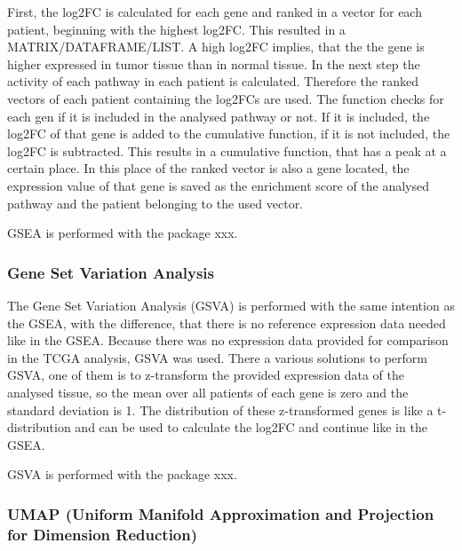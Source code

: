 \documentclass[
  parskip,
  oneside]{scrreprt}
\begin{document}
First, the log2FC is calculated for each gene and ranked in a vector for
each patient, beginning with the highest log2FC. This resulted in a
MATRIX/DATAFRAME/LIST. A high log2FC implies, that the the gene is
higher expressed in tumor tissue than in normal tissue. In the next step
the activity of each pathway in each patient is calculated. Therefore
the ranked vectors of each patient containing the log2FCs are used. The
function checks for each gen if it is included in the analysed pathway
or not. If it is included, the log2FC of that gene is added to the
cumulative function, if it is not included, the log2FC is subtracted.
This results in a cumulative function, that has a peak at a certain
place. In this place of the ranked vector is also a gene located, the
expression value of that gene is saved as the enrichment score of the
analysed pathway and the patient belonging to the used vector.

GSEA is performed with the package xxx.

\hypertarget{gene-set-variation-analysis}{%
\subsubsection{Gene Set Variation
Analysis}\label{gene-set-variation-analysis}}

The Gene Set Variation Analysis (GSVA) is performed with the same
intention as the GSEA, with the difference, that there is no reference
expression data needed like in the GSEA. Because there was no expression
data provided for comparison in the TCGA analysis, GSVA was used. There
a various solutions to perform GSVA, one of them is to z-transform the
provided expression data of the analysed tissue, so the mean over all
patients of each gene is zero and the standard deviation is 1. The
distribution of these z-transformed genes is like a t-distribution and
can be used to calculate the log2FC and continue like in the GSEA.

GSVA is performed with the package xxx.

\hypertarget{umap-uniform-manifold-approximation-and-projection-for-dimension-reduction}{%
\subsubsection{\texorpdfstring{UMAP (\textbf{Uniform Manifold
Approximation and Projection for Dimension
Reduction)}}{UMAP (Uniform Manifold Approximation and Projection for Dimension Reduction)}}\label{umap-uniform-manifold-approximation-and-projection-for-dimension-reduction}}
\end{document}
